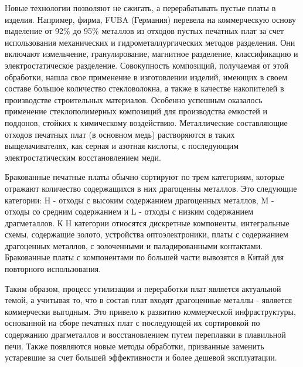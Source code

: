 Новые технологии позволяют не сжигать, а перерабатывать пустые платы в изделия. Например, фирма, FUBA (Германия) перевела на коммерческую основу выделение от 92\% до 95\% металлов из отходов пустых печатных плат за счет использования механических и гидрометаллургических методов разделения. Они включают измельчение, гранулирование, магнитное разделение, классификацию и электростатическое разделение. Совокупность композиций, получаемая от этой обработки, нашла свое применение в изготовлении изделий, имеющих в своем составе большое количество стекловолокна, а также в качестве накопителей в производстве строительных материалов. Особенно успешным оказалось применение стеклополимерных композиций для производства емкостей и поддонов, стойких к химическому воздействию. Металлические составляющие отходов печатных плат (в основном медь) растворяются в таких выщелачивателях, как серная и азотная кислоты, с последующим электростатическим восстановлением меди.

Бракованные печатные платы обычно сортируют по трем категориям, которые отражают количество содержащихся в них драгоценны металлов. Это следующие категории: H - отходы с высоким содержанием драгоценных металлов, M - отходы со средним содержанием и L - отходы с низким содержанием драгметаллов. К H категории относятся дискретные компоненты, интегральные схемы, содержащие золото, устройства оптоэлектроники, платы с содержанием драгоценных металлов, с золоченными и паладированными контактами. Бракованные платы с компонентами по большей части вывозятся в Китай для повторного использования.

Таким образом, процесс утилизации и переработки плат является актуальной темой, а учитывая то, что в состав плат входят драгоценные металлы - является коммерчески выгодным. Это привело к развитию коммерческой инфраструктуры, основанной на сборе печатных плат с последующей их сортировкой по содержанию драгметаллов и восстановлением путем переплавки в плавильной печи. Также появляются новые методы обработки, призванные заменить устаревшие за счет большей эффективности и более дешевой эксплуатации.
